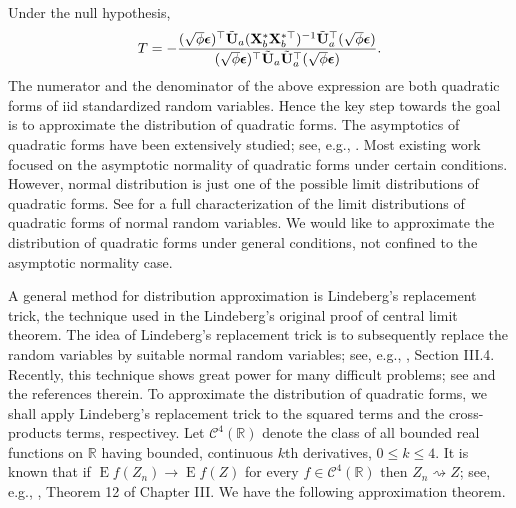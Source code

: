 \documentclass[smallextended]{svjour3}       %
\DeclareMathOperator{\myE}{E}
\begin{document}
Under the null hypothesis,
\begin{equation*}
    T=-\frac{ (\sqrt \phi \boldsymbol{\epsilon})^\top \tilde {\mathbf{U}}_a (\mathbf{X}_b^* \mathbf{X}_b^{*\top})^{-1} \tilde {\mathbf{U}}_a^\top (\sqrt \phi \boldsymbol{\epsilon})}{ (\sqrt \phi \boldsymbol{\epsilon})^\top \tilde {\mathbf{U}}_a  \tilde {\mathbf{U}}_a^\top (\sqrt \phi \boldsymbol{\epsilon})}.
\end{equation*}
The numerator and the denominator of the above expression are both quadratic forms of iid standardized random variables.
Hence the key step towards the goal is to approximate the distribution of quadratic forms.
The asymptotics of quadratic forms have been extensively studied; see, e.g., \cite{Bai2017,Bentkus1996Optimal,Dicker2015Flexible,Goetze2002,jiang1996reml,Jong1987A}.
Most existing work focused on the asymptotic normality of quadratic forms under certain conditions.
However, normal distribution is just one of the possible limit distributions of quadratic forms.
See \cite{Sevast1961A} for a full characterization of the limit distributions of quadratic forms of normal random variables.
We would like to approximate the distribution of quadratic forms under general conditions, not confined to the asymptotic normality case.

A general method for distribution approximation is Lindeberg's replacement trick, the technique used in the Lindeberg's original proof of central limit theorem.
The idea of Lindeberg's replacement trick is to subsequently replace the random variables by suitable normal random variables; see, e.g., \cite{pollard1984convergence}, Section III.4.
Recently, this technique shows great power for many difficult problems; see \cite{Chatterjee2006} and the references therein.
To approximate the distribution of quadratic forms, we shall apply Lindeberg's replacement trick to the squared terms and the cross-products terms, respectivey.
Let $\mathscr C^4(\mathbb R)$ denote the class of all bounded real functions on $\mathbb R$ having bounded, continuous $k$th derivatives, $0\leq k\leq 4$.
It is known that if $\myE f(Z_n)\to \myE f(Z)$ for every $f\in \mathscr C^4 (\mathbb R)$ then $Z_n \rightsquigarrow Z$; see, e.g., \cite{pollard1984convergence}, Theorem 12 of Chapter III.
We have the following approximation theorem.
\end{document}
